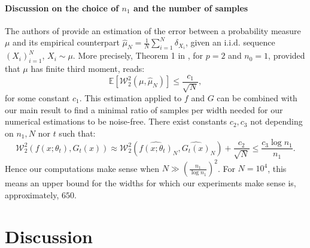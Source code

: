 \documentclass{article}
\theoremstyle{definition}
\theoremstyle{remark}
\numberwithin{equation}{section}
\newcommand{\E}{\mathbb{E}}
\begin{document}

\paragraph{Discussion on the choice of $n_1$ and the number of samples}
\label{paragraph:discussion}

The authors of \cite{Fournier2015} provide an estimation of the error between a probability measure $\mu$ and its empirical counterpart $\hat \mu_N = \frac{1}{N}\sum_{i=1}^N\delta_{X_i}$, 
given an i.i.d. sequence $(X_i)_{i=1}^N$, $X_i \sim \mu$.
More precisely, Theorem 1 in \cite{Fournier2015}, for $p = 2$ and $n_0=1$, provided that $\mu$ has finite third moment, reads:
\[
\E[\mathcal W_2^2(\mu,\hat\mu_N)] \le \frac{c_1}{\sqrt{N}},
\]
for some constant $c_1$.
This estimation applied to $f$ and $G$ can be combined with our main result to find a minimal ratio of samples per width needed for our numerical estimations to be noise-free.
There exist constants $c_2,c_3$ not depending on $n_1, N$ nor $t$ such that:
\[
    \mathcal W_2^2(f(x;\theta_t),G_t(x)) \approx \mathcal W_2^2(\widehat{f(x;\theta_t)}_N,\widehat{G_t(x)}_N) + \frac{c_2}{\sqrt{N}} \le \frac{c_3 \log n_1}{n_1}.
\]
Hence our computations make sense when $N \gg \left(\frac{n_1}{\log n_1}\right)^2$. 
For $N = 10^4$, this means an upper bound for the widths for which our experiments make sense is, approximately, $650$.

\section{Discussion}
\label{sec:discussion}
\end{document}
